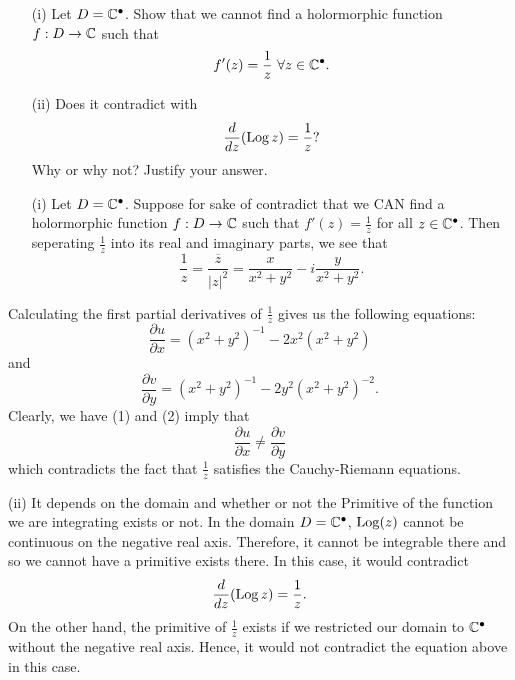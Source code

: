 \documentclass[a4paper]{article}
\begin{document}
\begin{problem}
    \begin{enumerate}
        \item[(i)] Let \( D = \mathbb{C}^{\bullet} \). Show that we cannot find a holormorphic function \( f: D \to \mathbb{C}  \) such that 
            \[  f'(z) = \frac{ 1 }{ z } \   \forall z \in \mathbb{C}^{\bullet}. \]
        \item[(ii)] Does it contradict with \[  \frac{ d }{ dz  }  (\operatorname{Log} z ) = \frac{ 1 }{ z }?  \] Why or why not? Justify your answer.
    \end{enumerate}
\end{problem}
\begin{solution}
    \begin{enumerate}
        \item[(i)] Let \( D = \mathbb{C}^{\bullet} \). Suppose for sake of contradict that we CAN find a holormorphic function \( f: D \to \mathbb{C}  \) such that \( f'(z) = \frac{ 1 }{ z }  \) for all \( z \in \mathbb{C}^{\bullet} \). Then seperating \( \frac{ 1 }{ z }  \) into its real and imaginary parts, we see that 
            \[  \frac{ 1 }{ z }  = \frac{ \overline{z} }{ | z |^{2} } = \frac{ x }{ x^{2} + y^{2} }  - i \frac{ y }{ x^{2} + y^{2} }. \]
    \end{enumerate}
    Calculating the first partial derivatives of \( \frac{ 1 }{ z }  \) gives us the following equations:
    \[  \frac{\partial u }{\partial x } = (x^{2} + y^{2})^{-1} - 2x^{2} (x^{2} + y^{2}) \tag{1} \]
    and
    \[  \frac{\partial v }{\partial y }  = (x^{2} + y^{2})^{-1} - 2 y^{2} (x^{2} + y^{2})^{-2}. \tag{2} \]
    Clearly, we have (1) and (2) imply that 
    \[  \frac{\partial u }{\partial x }  \neq \frac{\partial v }{\partial y }  \]
    which contradicts the fact that \( \frac{ 1 }{ z }  \) satisfies the Cauchy-Riemann equations.
    \item[(ii)] It depends on the domain and whether or not the Primitive of the function we are integrating exists or not. In the domain \( D = \mathbb{C}^{\bullet} \), \( \operatorname{Log}(z) \) cannot be continuous on the negative real axis. Therefore, it cannot be integrable there and so we cannot have a primitive exists there. In this case, it would contradict 
        \[  \frac{ d }{ dz } (\operatorname{Log} z) = \frac{ 1 }{ z }. \]
        On the other hand, the primitive of \( \frac{ 1 }{ z }  \) exists if we restricted our domain to \( \mathbb{C}^{\bullet} \) without the negative real axis. Hence, it would not contradict the equation above in this case.

\end{solution}
\end{document}
